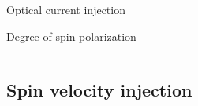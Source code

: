 \documentclass{beamer}
\begin{document}
\begin{frame}

\vspace{-0.2cm}

\noindent\makebox[\linewidth]{\rule{\linewidth}{0.4pt}}

\vspace{-2.0mm}
\begin{center}
{\large Optical current injection}
\end{center}

\vspace{-6mm}
\noindent\makebox[\linewidth]{\rule{\linewidth}{0.4pt}}

\vspace{2mm}
Degree of spin polarization

\begin{columns}





\end{columns}

\end{frame}


\subsection{Spin velocity injection}
\end{document}
